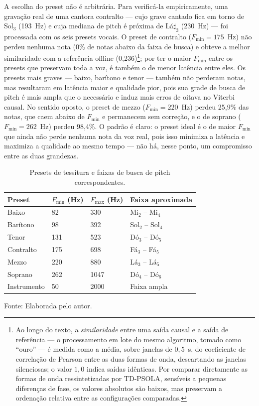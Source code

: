 A escolha do preset não é arbitrária. Para verificá-la empiricamente, uma gravação real de uma cantora contralto --- cujo grave cantado fica em torno de Sol$_3$ (193~Hz) e cuja mediana de pitch é próxima de Lá$\sharp_3$ (230~Hz) --- foi processada com os seis presets vocais. O preset de contralto ($F_{\min} = 175$~Hz) não perdeu nenhuma nota (0\% de notas abaixo da faixa de busca) e obteve a melhor similaridade com a referência offline (0{,}236)\footnote{Ao longo do texto, a \emph{similaridade} entre uma saída causal e a saída de referência --- o processamento em lote do mesmo algoritmo, tomado como ``ouro'' --- é medida como a média, sobre janelas de $0{,}5$~s, do coeficiente de correlação de Pearson entre as duas formas de onda, descartando as janelas silenciosas; o valor $1{,}0$ indica saídas idênticas. Por comparar diretamente as formas de onda ressintetizadas por TD-PSOLA, sensíveis a pequenas diferenças de fase, os valores absolutos são baixos, mas preservam a ordenação relativa entre as configurações comparadas.}; por ter o maior $F_{\min}$ entre os presets que preservam toda a voz, é também o de menor latência entre eles. Os presets mais graves --- baixo, barítono e tenor --- também não perderam notas, mas resultaram em latência maior e qualidade pior, pois sua grade de busca de pitch é mais ampla que o necessário e induz mais erros de oitava no Viterbi causal. No sentido oposto, o preset de mezzo ($F_{\min} = 220$~Hz) perdeu 25{,}9\% das notas, que caem abaixo de $F_{\min}$ e permanecem sem correção, e o de soprano ($F_{\min} = 262$~Hz) perdeu 98{,}4\%. O padrão é claro: o preset ideal é o de maior $F_{\min}$ que ainda não perde nenhuma nota da voz real, pois isso minimiza a latência e maximiza a qualidade ao mesmo tempo --- não há, nesse ponto, um compromisso entre as duas grandezas.

\begin{table}[H]
\centering
\caption{\label{tab:presets_tessitura}Presets de tessitura e faixas de busca de pitch correspondentes.}
\small
\begin{tabular}{|p{3.0cm}|p{2.5cm}|p{2.5cm}|p{6.0cm}|}
\hline
\textbf{Preset} & \textbf{$F_{\min}$ (Hz)} & \textbf{$F_{\max}$ (Hz)} & \textbf{Faixa aproximada} \\
\hline
Baixo       & 82  & 330  & Mi$_2$ -- Mi$_4$ \\
\hline
Barítono    & 98  & 392  & Sol$_2$ -- Sol$_4$ \\
\hline
Tenor       & 131 & 523  & Dó$_3$ -- Dó$_5$ \\
\hline
Contralto   & 175 & 698  & Fá$_3$ -- Fá$_5$ \\
\hline
Mezzo       & 220 & 880  & Lá$_3$ -- Lá$_5$ \\
\hline
Soprano     & 262 & 1047 & Dó$_4$ -- Dó$_6$ \\
\hline
Instrumento & 50  & 2000 & Faixa ampla \\
\hline
\end{tabular}
\small Fonte: Elaborada pelo autor.
\end{table}


